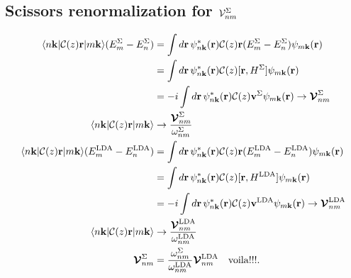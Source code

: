 \subsection{Scissors renormalization for $\calv^\gS_{nm}$}\label{voila}

\begin{align}\label{cdg.1}
\bra{n\bfk}\calc(z)\bfr\ket{m\bfk}(E^\gS_m-E^\gS_n) 
&=
\int d\bfr\,\psi^*_{n\bfk}(\bfr) 
\calc(z)\bfr (E^\gS_m-E^\gS_n) 
\psi_{m\bfk}(\bfr) 
\nonumber\\
&=
\int d\bfr\,\psi^*_{n\bfk}(\bfr) 
\calc(z)[\bfr,H^\gS]
\psi_{m\bfk}(\bfr) 
\nonumber\\
&=
-i\int d\bfr\,\psi^*_{n\bfk}(\bfr) 
\calc(z)\bfv^\gS 
\psi_{m\bfk}(\bfr) 
\to 
\calbv^\gS_{nm}
\nonumber\\
\bra{n\bfk}\calc(z)\bfr\ket{m\bfk}
&\to 
\frac{\calbv^\gS_{nm}}{\go^\gS_{nm}}
\nonumber\\
\bra{n\bfk}\calc(z)\bfr\ket{m\bfk}(E^\lda_m-E^\lda_n) 
&=
\int d\bfr\,\psi^*_{n\bfk}(\bfr) 
\calc(z)\bfr (E^\lda_m-E^\lda_n) 
\psi_{m\bfk}(\bfr) 
\nonumber\\
&=
\int d\bfr\,\psi^*_{n\bfk}(\bfr) 
\calc(z)[\bfr,H^\lda]
\psi_{m\bfk}(\bfr) 
\nonumber\\
&=
-i\int d\bfr\,\psi^*_{n\bfk}(\bfr) 
\calc(z)\bfv^\lda 
\psi_{m\bfk}(\bfr) 
\to 
\calbv^\lda_{nm}
\nonumber\\
\bra{n\bfk}\calc(z)\bfr\ket{m\bfk}
&\to 
\frac{\calbv^\lda_{nm}}{\go^\lda_{nm}}
\nonumber\\
\calbv^\gS_{nm}
&=
\frac{\go^\gS_{nm}}{\go^\lda_{nm}}
\calbv^\lda_{nm}\quad{\mathrm{voila}!!!}
.
\end{align}

